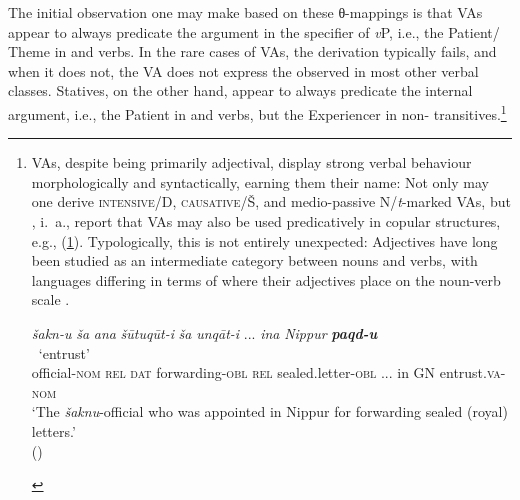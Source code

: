 \documentclass[output=paper,colorlinks,citecolor=brown]{langscibook}
\begin{document}
\largerpage
 The initial observation one may make based on these θ-mappings is that VAs appear to always predicate the argument in the specifier of \textit{v}P, i.e., the Patient/ Theme in  and  verbs. In the rare cases of  VAs, the derivation typically fails, and when it does not, the VA does not express the  observed in most other verbal classes. Statives, on the other hand, appear to always predicate the internal argument, i.e., the Patient in  and   verbs, but the Experiencer in non- transitives.\footnote{VAs,
    despite being primarily adjectival, display strong verbal behaviour morphologically and syntactically, earning them their name: Not only may one derive  \textsc{intensive}/D, \textsc{causative}/Š, and medio-passive N/\textit{t}-marked VAs, but \citet{huehnergard_stative_1987,buccellati_state_1988,kouwenberg_nouns_2000}, i.\ a., report that VAs may also be used predicatively in copular structures, e.g., (\ref{ex:fn}). Typologically, this is not entirely unexpected: Adjectives have long been studied as an intermediate category between nouns and verbs, with languages differing in terms of where their adjectives place on the noun-verb scale \citep{berg_position_2000,sasse_scales_2001}.

\begin{exe}
    \ex \label{ex:fn}
    \glll \textit{šakn-u} \textit{ša} \textit{ana} \textit{šūtuqūt-i} \textit{ša} \textit{unqāt-i} ... \textit{ina} \textit{Nippur} \textit{\textbf{paqd-u}} \hspace*{-3mm}\\
    {} {} {} {} {} {} {} {} {} ~`entrust'\hspace*{-3mm}\\
 official-\textsc{nom} \textsc{rel} \textsc{dat} forwarding-\textsc{obl} \textsc{rel} {sealed.letter}-\textsc{obl} ... in GN entrust.\textsc{va}-\textsc{nom}\hspace*{-3mm}\\
\glt `The \emph{šaknu}-official who was appointed in Nippur for forwarding sealed (royal) letters.'\\ \null \hfill ()
\end{exe} 
}\clearpage
\end{document}

